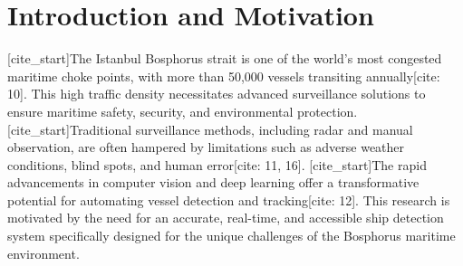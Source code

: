 \documentclass[10pt]{article}
\begin{document}

\section{Introduction and Motivation}
[cite_start]The Istanbul Bosphorus strait is one of the world's most congested maritime choke points, with more than 50,000 vessels transiting annually[cite: 10]. This high traffic density necessitates advanced surveillance solutions to ensure maritime safety, security, and environmental protection. [cite_start]Traditional surveillance methods, including radar and manual observation, are often hampered by limitations such as adverse weather conditions, blind spots, and human error[cite: 11, 16]. [cite_start]The rapid advancements in computer vision and deep learning offer a transformative potential for automating vessel detection and tracking[cite: 12]. This research is motivated by the need for an accurate, real-time, and accessible ship detection system specifically designed for the unique challenges of the Bosphorus maritime environment.
\end{document}
